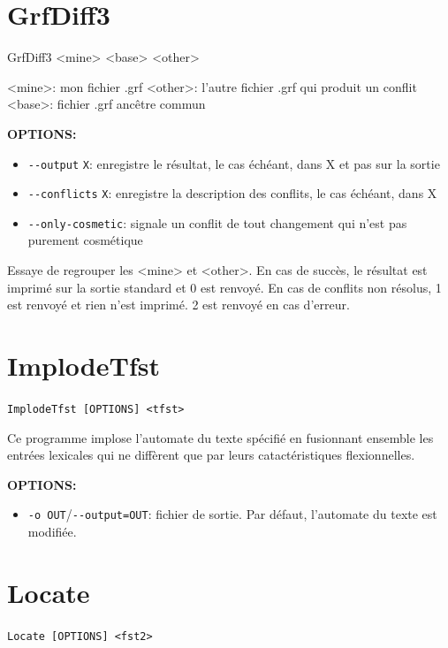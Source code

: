 \section{GrfDiff3}
GrfDiff3 <mine> <base> <other>

<mine>: mon fichier .grf
<other>: l'autre fichier .grf qui produit un conflit
<base>: fichier .grf ancêtre commun

\bigskip
\noindent \textbf{OPTIONS:}
\begin{itemize}
\item \verb+--output+ \verb+X+: enregistre le résultat, le cas échéant, dans X et pas sur la sortie
\item \verb+--conflicts+ \verb+X+: enregistre la description des conflits, le cas échéant, dans X
\item \verb+--only-cosmetic+: signale un conflit de tout changement qui n'est pas purement
	cosmétique
\end{itemize}

Essaye de regrouper les <mine> et <other>. En cas de succès, le résultat est imprimé sur la sortie
standard et 0 est renvoyé. En cas de conflits non résolus, 1 est renvoyé et rien n'est imprimé. 2
est renvoyé en cas d'erreur.



\section{ImplodeTfst}
 \verb+ImplodeTfst [OPTIONS] <tfst>+

\bigskip
\noindent Ce programme implose l'automate du texte spécifié en fusionnant ensemble les entrées lexicales qui ne diffèrent que par leurs catactéristiques flexionnelles.

\bigskip
\noindent \textbf{OPTIONS:}
\begin{itemize}
\item \verb+-o OUT+/\verb+--output=OUT+: fichier de sortie. Par défaut, l'automate du texte est modifiée.
\end{itemize}






\section{Locate}
\verb+Locate [OPTIONS] <fst2>+


